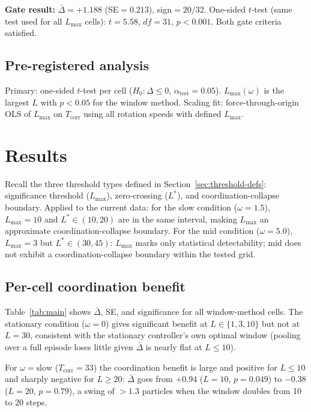 \documentclass[sigconf,anonymous]{aamas}
\newcommand{\Dbar}{\bar{\Delta}}
\newcommand{\Lmax}{L_{\max}}
\newcommand{\Tcorr}{T_{\mathrm{corr}}}
\begin{document}
\textbf{Gate result:} $\Dbar{=}{+}1.188$ (SE${}=0.213$),
sign${=}20/32$.  One-sided $t$-test (same test used for all
$\Lmax$ cells): $t{=}5.58$, $df{=}31$, $p{<}0.001$.
Both gate criteria satisfied. \checkmark

\subsection{Pre-registered analysis}

Primary: one-sided $t$-test per cell ($H_0: \Delta \leq 0$,
$\alpha_{\mathrm{test}}{=}0.05$).  $\Lmax(\omega)$ is the largest
$L$ with $p{<}0.05$ for the window method.  Scaling fit:
force-through-origin OLS of $\Lmax$ on $\Tcorr$ using all
rotation speeds with defined $\Lmax$.

\section{Results}
\label{sec:results}

\noindent Recall the three threshold types defined in
Section~\ref{sec:threshold-defs}: significance threshold ($\Lmax$),
zero-crossing ($L^*$), and coordination-collapse boundary.
Applied to the current data:
for the slow condition ($\omega{=}1.5$), $\Lmax{=}10$ and
$L^*{\in}(10,20)$ are in the same interval, making $\Lmax$ an
approximate coordination-collapse boundary.
For the mid condition ($\omega{=}5.0$), $\Lmax{=}3$ but
$L^*{\in}(30,45)$: $\Lmax$ marks only statistical detectability;
mid does not exhibit a coordination-collapse boundary within the
tested grid.

\subsection{Per-cell coordination benefit}

Table~\ref{tab:main} shows $\Dbar$, SE, and significance for
all window-method cells. The stationary condition ($\omega{=}0$)
gives significant benefit at $L \in \{1, 3, 10\}$ but not at
$L{=}30$, consistent with the stationary controller's own
optimal window (pooling over a full episode loses little given
$\Dbar$ is nearly flat at $L{\leq}10$).

For $\omega{=}\text{slow}$ ($\Tcorr{=}33$) the coordination
benefit is large and positive for $L \leq 10$ and sharply
negative for $L \geq 20$:
$\Dbar$ goes from $+0.94$ ($L{=}10$, $p{=}0.049$) to
$-0.38$ ($L{=}20$, $p{=}0.79$), a swing of $>1.3$ particles
when the window doubles from 10 to 20 steps.
\end{document}
